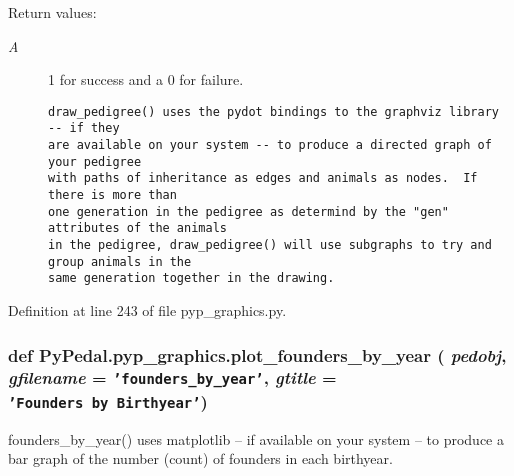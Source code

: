 \begin{Desc}
\item[Return values:]
\begin{description}
\item[{\em A}]1 for success and a 0 for failure.

\footnotesize\begin{verbatim}draw_pedigree() uses the pydot bindings to the graphviz library -- if they
are available on your system -- to produce a directed graph of your pedigree
with paths of inheritance as edges and animals as nodes.  If there is more than
one generation in the pedigree as determind by the "gen" attributes of the animals
in the pedigree, draw_pedigree() will use subgraphs to try and group animals in the
same generation together in the drawing.
\end{verbatim}
\normalsize
 \end{description}
\end{Desc}


Definition at line 243 of file pyp\_\-graphics.py.\hypertarget{namespacePyPedal_1_1pyp__graphics_3795b92107fa37e5416ed51e4decadb9}{
\subsubsection[plot\_\-founders\_\-by\_\-year]{\setlength{\rightskip}{0pt plus 5cm}def Py\-Pedal.pyp\_\-graphics.plot\_\-founders\_\-by\_\-year ( {\em pedobj},  {\em gfilename} = {\tt 'founders\_\-by\_\-year'},  {\em gtitle} = {\tt 'Founders~by~Birthyear'})}}
\label{namespacePyPedal_1_1pyp__graphics_3795b92107fa37e5416ed51e4decadb9}


founders\_\-by\_\-year() uses matplotlib -- if available on your system -- to produce a bar graph of the number (count) of founders in each birthyear. 


